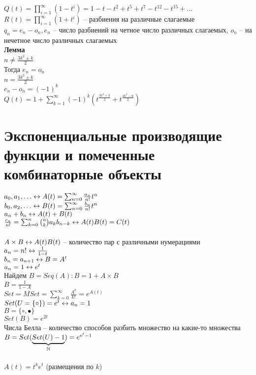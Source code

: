 \documentclass[12pt]{article}
\begin{document}
$Q(t) = \prod_{i=1}^\infty (1-t^i) = 1 - t - t^2 + t^5 + t^7 - t^{12} - t^{15} + \ldots$\\
$R(t) = \prod_{i=1}^\infty (1+t^i)$ -- разбиения на различные слагаемые\\
$q_n = e_n - o_n, e_n$ -- число разбиений на четное число различных слагаемых, $o_n$ -- на нечетное число различных слагаемых\\
\textbf{Лемма}\\
$n \neq \frac{3k^2 \pm  k}{2}$\\
Тогда $e_n = o_n$\\
$n = \frac{3k^2 \pm k}{2}$\\
$e_n - o_n = (-1)^k$\\
$Q(t) = 1 + \sum_{k=1}^\infty (-1)^k (t^{\frac{3k^2+k}2}+t^{\frac{3k^2-k}2})$
\section{Экспоненциальные производящие функции и помеченные комбинаторные объекты}
$a_0, a_1, \ldots \leftrightarrow A(t) = \sum_{n=0}^{\infty} \frac{a_n}{n!}t^n$\\
$b_0, a_2, \ldots \leftrightarrow B(t) = \sum_{n=0}^\infty \frac{b_n}{n!}t^n$\\
$a_n + b_n \leftrightarrow A(t) + B(t)$\\
$\frac{c_n}{n!} = \sum_{k=0}^{n} \binom{n}{k}a_k b_{n-k} \leftrightarrow A(t)B(t) = C(t)$\\\\
$A \times B \leftrightarrow A(t)B(t)$ -- количество пар с различными нумерациями\\
$a_n = n! \leftrightarrow \frac{1}{1-t}$\\
$b_n = a_{n+1} \leftrightarrow B = A'$\\
$a_n = 1 \leftrightarrow e^t$\\
Найдем $B = Seq(A): B = 1 + A\times B$\\
$B = \frac{1}{1-A}$\\
$Set = MSet = \sum_{k=0}^\infty \frac{A^k}{k!} = e^{A(t)}$\\
$Set(U = \{\circ\}) = e^t \leftrightarrow a_n = 1$\\
$B = \{\circ, \bullet\}$\\
$Set(B) = e^{2t}$\\
Числа Белла -- количество способов разбить множество на какие-то множества\\
$B = Set(\underbrace{Set(U) - 1}_{\mathbb{N}}) = e^{e^t - 1}$\\\\
$A(t) = t^k e^t$ (размещения по $k$)\\
\end{document}
